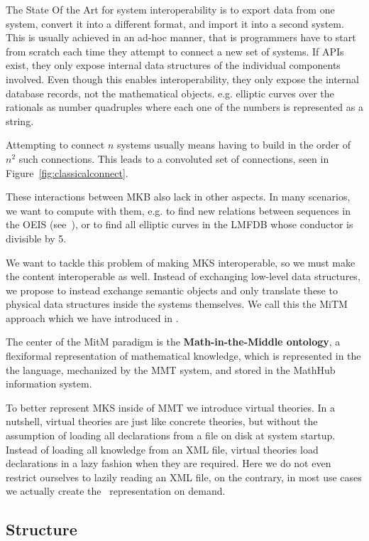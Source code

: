 The State Of the Art for system interoperability is to export data from one system, convert it into a different format, and import it into a second system. 
This is usually achieved in an ad-hoc manner, that is programmers have to start from scratch each time they attempt to connect a new set of systems. 
If APIs exist, they only expose internal data structures of the individual components involved. 
Even though this enables interoperability, they only expose the internal database records, not the mathematical objects. e.g. elliptic curves over the rationals as number quadruples where each one of the numbers is represented as a string.

Attempting to connect $n$ systems usually means having to build in the order of $n^2$ such connections. 
This leads to a convoluted set of connections, seen in Figure~\ref{fig:classicalconnect}. 

These interactions between MKB also lack in other aspects. 
In many scenarios, we want to compute with them, e.g. to find new relations between sequences in the OEIS (see~\cite{LuzKoh:fsarfo16}), or to find all elliptic curves in the LMFDB whose conductor is divisible by 5. 

We want to tackle this problem of making MKS interoperable, so we must make the content interoperable as well. 
Instead of exchanging low-level data structures, we propose to instead exchange semantic objects and only translate these to physical data structures inside the systems themselves. 
We call this the MiTM approach which we have introduced in \cite{DehKohKon:iop16}. 

The center of the MitM paradigm is the \textbf{Math-in-the-Middle ontology}, a flexiformal representation of mathematical knowledge, which is represented in the the \omdocmmt language, mechanized by the MMT system, and stored in the MathHub information system. 


To better represent MKS inside of MMT we introduce virtual theories. 
In a nutshell, virtual theories are just like concrete theories, but without the assumption of loading all declarations from a file on disk at system startup. 
Instead of loading all knowledge from an XML file, virtual theories load declarations in a lazy fashion when they are required. 
Here we do not even restrict ourselves to lazily reading an XML file, on the contrary, in most use cases we actually create the \omdocmmt\ representation on demand. 


\subsection*{Structure}\label{sec:intr:structure}


